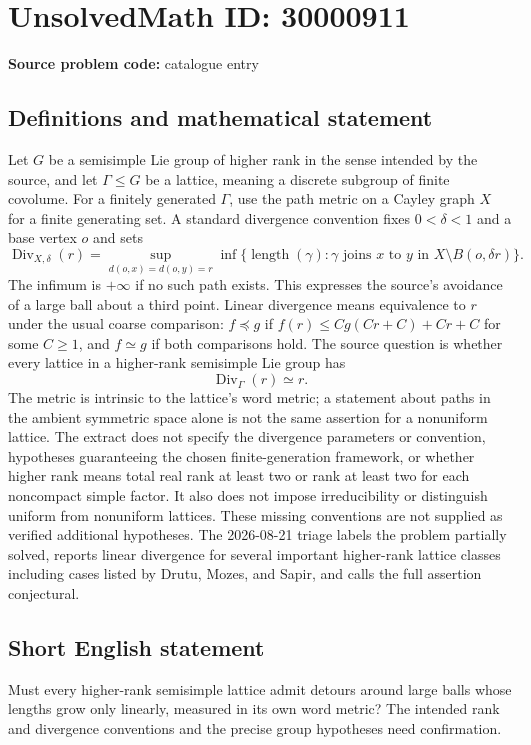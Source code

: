 \documentclass[11pt]{article}
\begin{document}
\section*{UnsolvedMath ID: 30000911}
\textbf{Source problem code:} catalogue entry
\subsection{Definitions and mathematical statement}
Let $G$ be a semisimple Lie group of higher rank in the sense intended by the source, and let $\Gamma\leq G$ be a lattice, meaning a discrete subgroup of finite covolume. For a finitely generated $\Gamma$, use the path metric on a Cayley graph $X$ for a finite generating set. A standard divergence convention fixes $0<\delta<1$ and a base vertex $o$ and sets \[\operatorname{Div}_{X,\delta}(r)=\sup_{d(o,x)=d(o,y)=r}\inf\{\operatorname{length}(\gamma):\gamma\text{ joins }x\text{ to }y\text{ in }X\setminus B(o,\delta r)\}.\] The infimum is $+\infty$ if no such path exists. This expresses the source's avoidance of a large ball about a third point. Linear divergence means equivalence to $r$ under the usual coarse comparison: $f\preceq g$ if $f(r)\leq Cg(Cr+C)+Cr+C$ for some $C\geq1$, and $f\simeq g$ if both comparisons hold. The source question is whether every lattice in a higher-rank semisimple Lie group has \[\operatorname{Div}_\Gamma(r)\simeq r.\] The metric is intrinsic to the lattice's word metric; a statement about paths in the ambient symmetric space alone is not the same assertion for a nonuniform lattice. The extract does not specify the divergence parameters or convention, hypotheses guaranteeing the chosen finite-generation framework, or whether higher rank means total real rank at least two or rank at least two for each noncompact simple factor. It also does not impose irreducibility or distinguish uniform from nonuniform lattices. These missing conventions are not supplied as verified additional hypotheses. The 2026-08-21 triage labels the problem partially solved, reports linear divergence for several important higher-rank lattice classes including cases listed by Drutu, Mozes, and Sapir, and calls the full assertion conjectural.
\subsection{Short English statement}
Must every higher-rank semisimple lattice admit detours around large balls whose lengths grow only linearly, measured in its own word metric? The intended rank and divergence conventions and the precise group hypotheses need confirmation.
\end{document}

